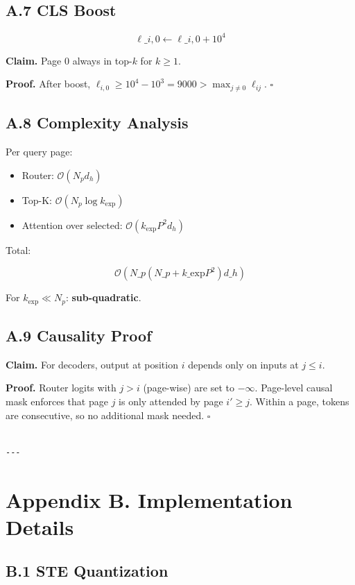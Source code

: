 \subsection{A.7 CLS Boost}

\[
\ell\_{i, 0} \leftarrow \ell\_{i, 0} + 10^4
\tag{A.14}
\]

\textbf{Claim.} Page 0 always in top-$k$ for $k \geq 1$.

\textbf{Proof.} After boost, $\ell_{i, 0} \geq 10^4 - 10^3 = 9000 > \max_{j \neq 0} \ell_{ij}$. $\square$

\subsection{A.8 Complexity Analysis}

Per query page:
\begin{itemize}
\item Router: $\mathcal{O}(N_p d_h)$
\item Top-K: $\mathcal{O}(N_p \log k_\text{exp})$
\item Attention over selected: $\mathcal{O}(k_\text{exp} P^2 d_h)$

\end{itemize}
Total:

\[
\mathcal{O}(N\_p (N\_p + k\_\text{exp} P^2) d\_h)
\tag{A.15}
\]

For $k_\text{exp} \ll N_p$: \textbf{sub-quadratic}.

\subsection{A.9 Causality Proof}

\textbf{Claim.} For decoders, output at position $i$ depends only on inputs at $j \leq i$.

\textbf{Proof.} Router logits with $j > i$ (page-wise) are set to $-\infty$. 
Page-level causal mask enforces that page $j$ is only attended by page $i' \geq j$. Within a page, tokens are consecutive, so no additional mask needed. $\square$
\begin{lstlisting}

---
\end{lstlisting}

\section{Appendix B. Implementation Details}

\subsection{B.1 STE Quantization}

